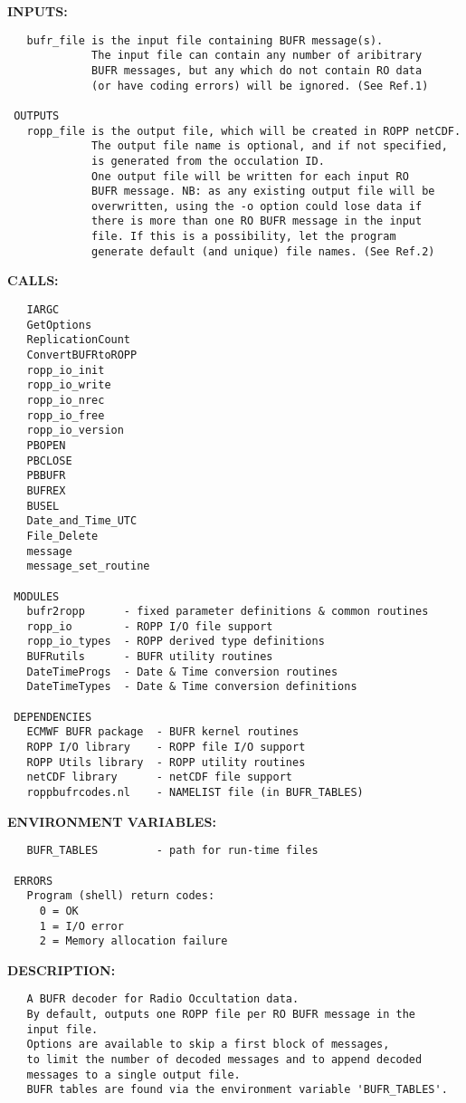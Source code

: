 \textbf{INPUTS:}\hspace{0.08in}\begin{Verbatim}
   bufr_file is the input file containing BUFR message(s).
             The input file can contain any number of aribitrary
             BUFR messages, but any which do not contain RO data
             (or have coding errors) will be ignored. (See Ref.1)

 OUTPUTS
   ropp_file is the output file, which will be created in ROPP netCDF.
             The output file name is optional, and if not specified,
             is generated from the occulation ID.
             One output file will be written for each input RO
             BUFR message. NB: as any existing output file will be
             overwritten, using the -o option could lose data if
             there is more than one RO BUFR message in the input
             file. If this is a possibility, let the program
             generate default (and unique) file names. (See Ref.2)
\end{Verbatim}
\textbf{CALLS:}\hspace{0.08in}\begin{Verbatim}
   IARGC
   GetOptions
   ReplicationCount
   ConvertBUFRtoROPP
   ropp_io_init
   ropp_io_write
   ropp_io_nrec
   ropp_io_free
   ropp_io_version
   PBOPEN
   PBCLOSE
   PBBUFR
   BUFREX
   BUSEL
   Date_and_Time_UTC
   File_Delete
   message
   message_set_routine

 MODULES
   bufr2ropp      - fixed parameter definitions & common routines
   ropp_io        - ROPP I/O file support
   ropp_io_types  - ROPP derived type definitions
   BUFRutils      - BUFR utility routines
   DateTimeProgs  - Date & Time conversion routines
   DateTimeTypes  - Date & Time conversion definitions

 DEPENDENCIES
   ECMWF BUFR package  - BUFR kernel routines
   ROPP I/O library    - ROPP file I/O support
   ROPP Utils library  - ROPP utility routines
   netCDF library      - netCDF file support
   roppbufrcodes.nl    - NAMELIST file (in BUFR_TABLES)
\end{Verbatim}
\textbf{ENVIRONMENT VARIABLES:}\hspace{0.08in}\begin{Verbatim}
   BUFR_TABLES         - path for run-time files

 ERRORS
   Program (shell) return codes:
     0 = OK
     1 = I/O error
     2 = Memory allocation failure
\end{Verbatim}
\textbf{DESCRIPTION:}\hspace{0.08in}\begin{Verbatim}
   A BUFR decoder for Radio Occultation data.
   By default, outputs one ROPP file per RO BUFR message in the
   input file.
   Options are available to skip a first block of messages,
   to limit the number of decoded messages and to append decoded
   messages to a single output file.
   BUFR tables are found via the environment variable 'BUFR_TABLES'.
\end{Verbatim}
